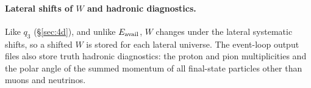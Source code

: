 \paragraph{Lateral shifts of $W$ and hadronic diagnostics.} Like $q_{3}$ (\S\ref{sec:4d}), and unlike $E_{\mathrm{avail}}$, $W$ changes under the lateral systematic shifts, so a shifted $W$ is stored for each lateral universe. The event-loop output files also store truth hadronic diagnostics: the proton and pion multiplicities and the polar angle of the summed momentum of all final-state particles other than muons and neutrinos.


